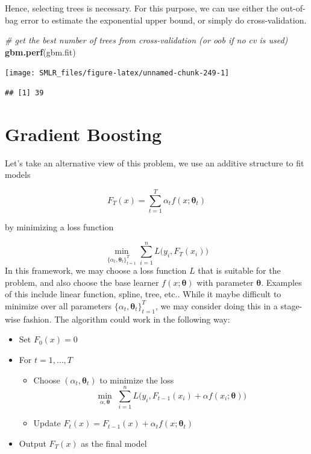 \documentclass[
]{book}
\newenvironment{Shaded}{\begin{snugshade}}{\end{snugshade}}
\newcommand{\CommentTok}[1]{\textcolor[rgb]{0.56,0.35,0.01}{\textit{#1}}}
\newcommand{\FunctionTok}[1]{\textcolor[rgb]{0.13,0.29,0.53}{\textbf{#1}}}
\newcommand{\NormalTok}[1]{#1}
\providecommand{\tightlist}{%
  \setlength{\itemsep}{0pt}\setlength{\parskip}{0pt}}
\theoremstyle{definition}
\theoremstyle{definition}
\theoremstyle{definition}
\theoremstyle{definition}
\theoremstyle{remark}
\begin{document}
Hence, selecting trees is necessary. For this purpose, we can use either the out-of-bag error to estimate the exponential upper bound, or simply do cross-validation.

\begin{Shaded}
\begin{Highlighting}[]
  \CommentTok{\# get the best number of trees from cross{-}validation (or oob if no cv is used)}
  \FunctionTok{gbm.perf}\NormalTok{(gbm.fit)}
\end{Highlighting}
\end{Shaded}

\begin{center}\texttt{[image: SMLR\_files/figure-latex/unnamed-chunk-249-1]} \end{center}

\begin{verbatim}
## [1] 39
\end{verbatim}

\hypertarget{gradient-boosting}{%
\section{Gradient Boosting}\label{gradient-boosting}}

Let's take an alternative view of this problem, we use an additive structure to fit models

\[F_T(x) = \sum_{t = 1}^T \alpha_t f(x; \boldsymbol \theta_t)\]

by minimizing a loss function

\[\underset{\{\alpha_t, \boldsymbol \theta_t\}_{t=1}^T}{\min} \sum_{i=1}^n L\big(y_i, F_T(x_i)\big)\]
In this framework, we may choose a loss function \(L\) that is suitable for the problem, and also choose the base learner \(f(x; \boldsymbol \theta)\) with parameter \(\boldsymbol \theta\). Examples of this include linear function, spline, tree, etc.. While it maybe difficult to minimize over all parameters \(\{\alpha_t, \boldsymbol \theta_t\}_{t=1}^T\), we may consider doing this in a stage-wise fashion. The algorithm could work in the following way:

\begin{itemize}
\tightlist
\item
  Set \(F_0(x) = 0\)
\item
  For \(t = 1, \ldots, T\)

  \begin{itemize}
  \tightlist
  \item
    Choose \((\alpha_t, \boldsymbol \theta_t)\) to minimize the loss
    \[\underset{\alpha, \boldsymbol \theta}{\min} \,\, \sum_{i=1}^n L\big(y_i, F_{t-1}(x_i) + \alpha f(x_i; \boldsymbol \theta)\big)\]
  \item
    Update \(F_t(x) = F_{t-1}(x) + \alpha_t f(x; \boldsymbol \theta_t)\)
  \end{itemize}
\item
  Output \(F_T(x)\) as the final model
\end{itemize}
\end{document}
